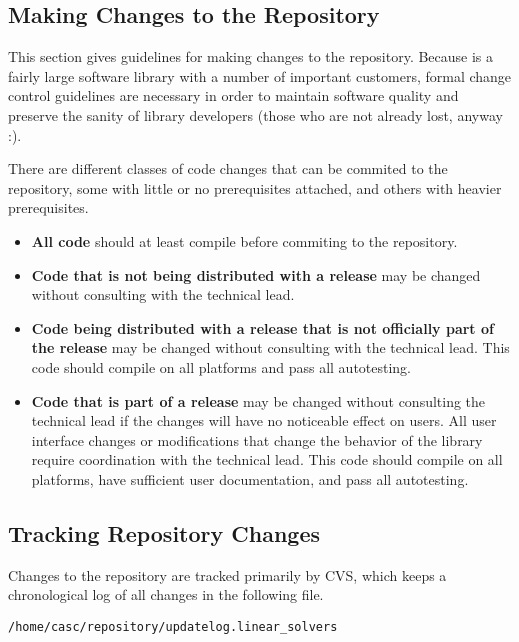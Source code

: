 \subsection{Making Changes to the Repository}
\label{Making Changes to the Repository}

This section gives guidelines for making changes to the repository.
Because \hypre{} is a fairly large software library with a number of
important customers, formal change control guidelines are necessary in
order to maintain software quality and preserve the sanity of library
developers (those who are not already lost, anyway :).

There are different classes of code changes that can be commited to
the repository, some with little or no prerequisites attached, and
others with heavier prerequisites.
\begin{itemize}

\item {\bf All code} should at least compile before commiting
to the repository.

\item {\bf Code that is not being distributed with a release}
may be changed without consulting with the \hypre{} technical lead.

\item {\bf Code being distributed with a release that is not officially
part of the release} may be changed without consulting with the
\hypre{} technical lead.  This code should compile on all platforms
and pass all autotesting.

\item {\bf Code that is part of a release} may be changed without
consulting the \hypre{} technical lead if the changes will have no
noticeable effect on users.  All user interface changes or
modifications that change the behavior of the library require
coordination with the \hypre{} technical lead.  This code should
compile on all platforms, have sufficient user documentation, and pass
all autotesting.

\end{itemize}


\subsection{Tracking Repository Changes}
\label{Tracking Repository Changes}

Changes to the repository are tracked primarily by CVS, which keeps a
chronological log of all changes in the following file.
\begin{verbatim}
/home/casc/repository/updatelog.linear_solvers
\end{verbatim}

